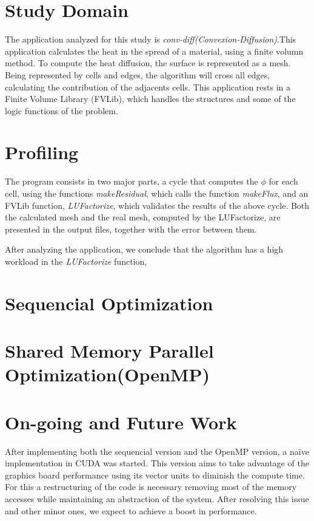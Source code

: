 \documentclass[a4paper,10pt,openright,openbib,twocolumn]{article}
\begin{document}
\section{Study Domain}

The application analyzed for this study is \emph{conv-diff(Convexion-Diffusion)}.This application calculates the heat in the spread of a material, using a finite volumn method. To compute the heat diffusion, the surface is represented as a mesh. Being represented by cells and edges, the algorithm will cross all edges, calculating the contribution of the adjacents cells. This application rests in a Finite Volume Library (FVLib), which handles the structures and some of the logic functions of the problem.


\section{Profiling}

The program consists in two major parts, a cycle that computes the $\phi$ for each cell, using the functions \emph{makeResidual}, which calls the function \emph{makeFlux}, and an FVLib function, \emph{LUFactorize}, which validates the results of the above cycle. Both the calculated mesh and the real mesh, computed by the LUFactorize, are presented in the output files, together with the error between them.
 
After analyzing the application, we conclude that the algorithm has a high workload in the \emph{LUFactorize} function,


\section{Sequencial Optimization}


\section{Shared Memory Parallel Optimization(OpenMP)}


\section{On-going and Future Work}

After implementing both the sequencial version and the OpenMP version, a na\"{i}ve implementation in CUDA was started. This version aims to take advantage of the graphics board performance using its vector units to diminish the compute time. For this a restructuring of the code is necessary removing most of the memory accesses while maintaining an abstraction of the system. After resolving this issue and other minor ones, we expect to achieve a boost in performance.
\end{document}

